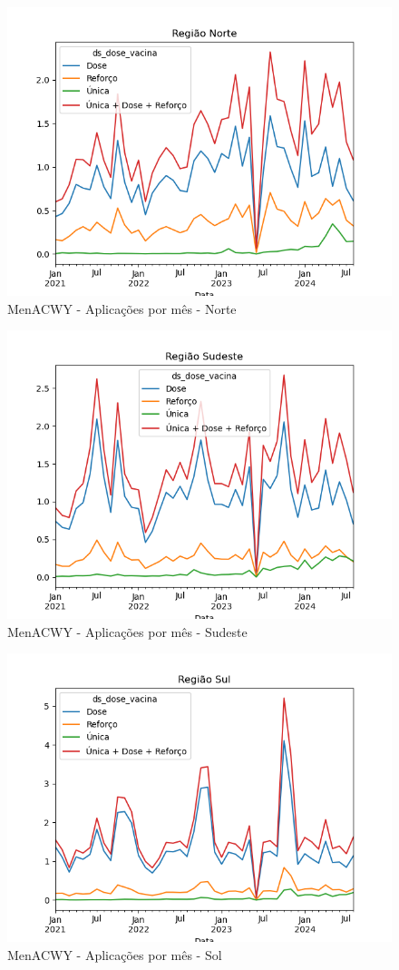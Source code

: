 \documentclass[12pt]{article}
\begin{document}
\begin{figure}[H]
    \centering
    \includegraphics[width=0.85\linewidth]{imagens/MenACWY-Norte-Aplicacoes-mes}
    \caption{MenACWY - Aplicações por mês - Norte}
    \label{fig:MenACWY-norte-aplicacoes-mes}
\end{figure}
\begin{figure}[H]
    \centering
    \includegraphics[width=0.85\linewidth]{imagens/MenACWY-Sudeste-Aplicacoes-mes}
    \caption{MenACWY - Aplicações por mês - Sudeste}
    \label{fig:MenACWY-sudeste-aplicacoes-mes}
\end{figure}
\begin{figure}[H]
    \centering
    \includegraphics[width=0.85\linewidth]{imagens/MenACWY-Sul-Aplicacoes-mes}
    \caption{MenACWY - Aplicações por mês - Sol}
    \label{fig:MenACWY-sul-aplicacoes-mes}
\end{figure}
\end{document}
